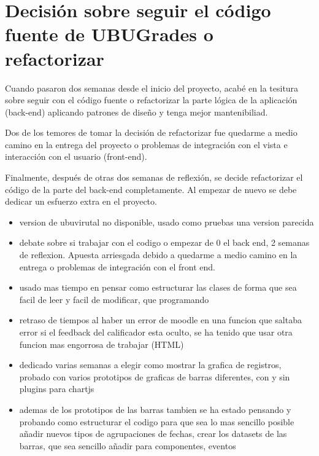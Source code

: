 \section{Decisión sobre seguir el código fuente de UBUGrades o refactorizar}

Cuando pasaron dos semanas desde el inicio del proyecto, acabé en la tesitura sobre seguir con el código fuente o refactorizar la parte lógica de la aplicación (back-end) aplicando patrones de diseño y tenga mejor mantenibiliad. 

Dos de los temores de tomar la decisión de refactorizar fue quedarme a medio camino en la entrega del proyecto o problemas de integración con el vista e interacción con el usuario (front-end).

Finalmente, después de otras dos semanas de reflexión, se decide refactorizar el código de la parte del back-end completamente. Al empezar de nuevo se debe dedicar un esfuerzo extra en el proyecto.



\begin{itemize}
	\item version de ubuvirutal no disponible, usado como pruebas una version parecida
	\item debate sobre si trabajar con el codigo o empezar de 0 el back end, 2 semanas de reflexion. Apuesta arriesgada debido a quedarme a medio camino en la entrega o problemas de integración con el front end.
	\item usado mas tiempo en pensar como estructurar las clases de forma que sea facil de leer y facil de modificar, que programando
	\item retraso de tiempos al haber un error de moodle en una funcion que saltaba error si el feedback del calificador esta oculto, se ha tenido que usar otra funcion mas engorrosa de trabajar (HTML)
	\item dedicado varias semanas a elegir como mostrar la grafica de registros, probado con varios prototipos de graficas de barras diferentes, con y sin plugins para chartjs
	\item ademas de los prototipos de las barras tambien se ha estado pensando y probando como estructurar el codigo para que sea lo mas sencillo posible añadir nuevos tipos de agrupaciones de fechas, crear los datasets de las barras, que sea sencillo añadir para componentes, eventos
\end{itemize}

